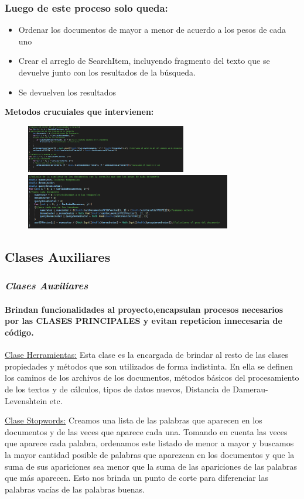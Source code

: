 \begin{frame}
\frametitle{Luego de este proceso solo queda:}
\begin{block}{}
    \begin{itemize}
    \item Ordenar los documentos de mayor a menor de acuerdo a los pesos de cada uno
    \item Crear el arreglo de SearchItem, incluyendo fragmento del texto que se devuelve junto con los resultados de la búsqueda. 
\item Se devuelven los resultados
\end{itemize}
\textbf{\color{orange}Metodos crucuiales que intervienen:}
\begin{figure}[h]
    \includegraphics[width=70mm]{Imagen8.png}
    \includegraphics[width=90mm]{Imagen9.png}
\end{figure}
\end{block}

\end{frame}

\subsection*{Clases Auxiliares}

\begin{frame}
    \frametitle{\emph{\huge{Clases Auxiliares}}}
\framesubtitle{Brindan funcionalidades al proyecto,encapsulan procesos necesarios por las CLASES PRINCIPALES y evitan repeticion innecesaria de código.}

\begin{block}{\underline{Clase Herramientas:}}
    Esta clase es la encargada de brindar al resto de las clases propiedades y métodos que son utilizados de forma indistinta. En ella se definen los caminos de los archivos de los documentos, métodos básicos del procesamiento de los textos y de cálculos, tipos de datos nuevos, Distancia de Damerau-Levenshtein etc.
\end{block}
\begin{block}{\underline{Clase Stopwords:}}
    Creamos una lista de las palabras que aparecen en los documentos y de las veces que aparece cada una. Tomando en cuenta las veces que aparece cada palabra, ordenamos este listado de menor a mayor y buscamos la mayor cantidad posible de palabras que aparezcan en los documentos y que la suma de sus apariciones sea menor que la suma de las apariciones de las palabras que más aparecen. Esto nos brinda un punto de corte para diferenciar las palabras vacías de las palabras buenas.
\end{block}
\end{frame}

